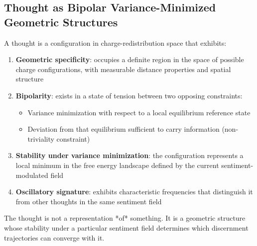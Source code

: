 \subsection{Thought as Bipolar Variance-Minimized Geometric Structures}

\begin{definition}
\label{def:bipolar-thought}
A thought is a configuration in charge-redistribution space that exhibits:

\begin{enumerate}[label=(\arabic*),leftmargin=*]
\item \textbf{Geometric specificity}: occupies a definite region in the space of possible charge configurations, with measurable distance properties and spatial structure

\item \textbf{Bipolarity}: exists in a state of tension between two opposing constraints:
\begin{itemize}
\item Variance minimization with respect to a local equilibrium reference state
\item Deviation from that equilibrium sufficient to carry information (non-triviality constraint)
\end{itemize}

\item \textbf{Stability under variance minimization}: the configuration represents a local minimum in the free energy landscape defined by the current sentiment-modulated field

\item \textbf{Oscillatory signature}: exhibits characteristic frequencies that distinguish it from other thoughts in the same sentiment field
\end{enumerate}

The thought is not a representation *of* something. It is a geometric structure whose stability under a particular sentiment field determines which discernment trajectories can converge with it.
\end{definition}

